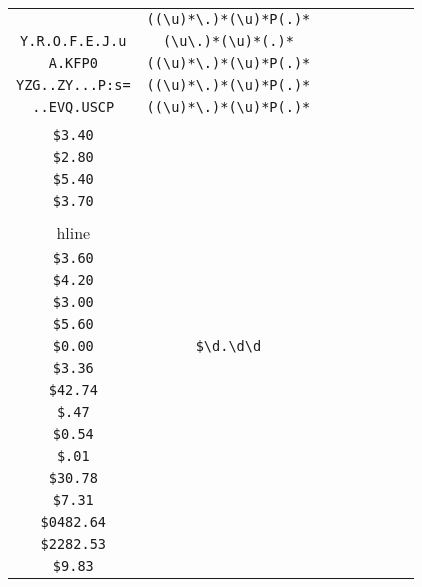\begin{longtable}{cccccccc}
\begin{tabular}{ll}
    \verb|...JP^B| & \verb|((\u)*\.)*(\u)*P(.)*|\\
\verb|Y.R.O.F.E.J.u| & \verb|(\u\.)*(\u)*(.)*|\\
\verb|A.KFP0| & \verb|((\u)*\.)*(\u)*P(.)*|\\
\verb|YZG..ZY...P:s=| & \verb|((\u)*\.)*(\u)*P(.)*|\\
\verb|..EVQ.USCP| & \verb|((\u)*\.)*(\u)*P(.)*|
\end{tabular}
\\\midrule 
\begin{tabular}{l}
    \verb|$5.70|\\
\verb|$3.40|\\
\verb|$2.80|\\
\verb|$5.40|\\
\verb|$3.70|\\
\\hline\\
\verb|$3.60|\\
\verb|$4.20|\\
\verb|$3.00|\\
\verb|$5.60|\\
\verb|$0.00|
\end{tabular}

&
\verb|$\d.\d\d|
&

\begin{tabular}{l}
    \verb|$(\d)*\.\d\d|\\
\verb|$3.36|\\
\verb|$42.74|\\
\verb|$.47|\\
\verb|$0.54|\\
\verb|$.01|
\end{tabular}

&

\begin{tabular}{l}
    \verb|$\d(\d)*\.\d\d|\\
\verb|$30.78|\\
\verb|$7.31|\\
\verb|$0482.64|\\
\verb|$2282.53|\\
\verb|$9.83|
\end{tabular}

&


\end{longtable}
